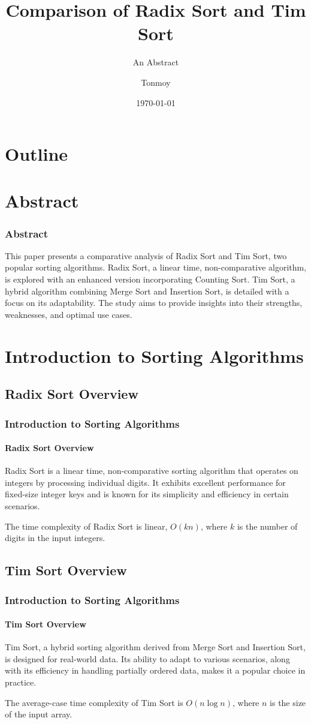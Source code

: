 \documentclass{beamer}
\title[Comparison of Radix Sort and Tim Sort]{Comparison of Radix Sort and Tim Sort}
\subtitle{An Abstract}
\author[Tonmoy]{Tonmoy}
\institute[CSE, RUET]{CSE, RUET}
\date{\today}
\begin{document}
\frame[plain]{\titlepage}

\section*{Outline}

\section{Abstract}
\begin{frame}[t]
    \frametitle{Abstract}
    \cite{verma2013new}This paper presents a comparative analysis of Radix Sort and Tim Sort, two popular sorting algorithms. Radix Sort, a linear time, non-comparative algorithm, is explored with an enhanced version incorporating Counting Sort. Tim Sort, a hybrid algorithm combining Merge Sort and Insertion Sort, is detailed with a focus on its adaptability. The study aims to provide insights into their strengths, weaknesses, and optimal use cases.
\end{frame}

\section{Introduction to Sorting Algorithms}
\subsection[Radix Sort]{Radix Sort Overview}
\begin{frame}[t]
    \frametitle{Introduction to Sorting Algorithms}
    \framesubtitle{Radix Sort Overview}
    Radix Sort is a linear time, non-comparative sorting algorithm that operates on integers by processing individual digits. It exhibits excellent performance for fixed-size integer keys and is known for its simplicity and efficiency in certain scenarios.\cite{shukla2012review}

    The time complexity of Radix Sort is linear, \(O(kn)\), where \(k\) is the number of digits in the input integers.
\end{frame}

\subsection[Tim Sort]{Tim Sort Overview}
\begin{frame}[t]
    \frametitle{Introduction to Sorting Algorithms}
    \framesubtitle{Tim Sort Overview}
    Tim Sort, a hybrid sorting algorithm derived from Merge Sort and Insertion Sort, is designed for real-world data. Its ability to adapt to various scenarios, along with its efficiency in handling partially ordered data, makes it a popular choice in practice.

    The average-case time complexity of Tim Sort is \(O(n \log n)\), where \(n\) is the size of the input array.\cite{hammad2015comparative}
\end{frame}
\end{document}
